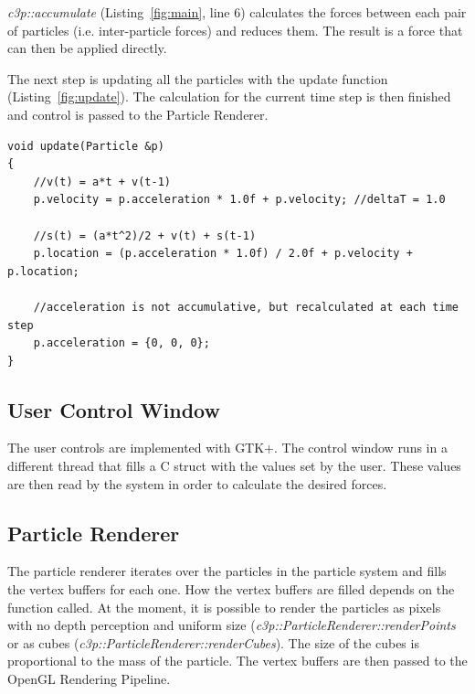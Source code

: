 \documentclass[runningheads,a4paper]{llncs}
\begin{document}
\emph{c3p::accumulate} (Listing~\ref{fig:main}, line 6) calculates the forces between each pair of particles (i.e. inter-particle forces) and reduces them. The result is a force that can then be applied directly.

The next step is updating all the particles with the update function (Listing~\ref{fig:update}). The calculation for the current time step is then finished and control is passed to the Particle Renderer.

\begin{lstlisting}[caption=update function]
void update(Particle &p)
{
	//v(t) = a*t + v(t-1)                                                            
	p.velocity = p.acceleration * 1.0f + p.velocity; //deltaT = 1.0                                  
                                                                                           
	//s(t) = (a*t^2)/2 + v(t) + s(t-1)                                               
	p.location = (p.acceleration * 1.0f) / 2.0f + p.velocity + p.location;
                                       	
	//acceleration is not accumulative, but recalculated at each time step          
	p.acceleration = {0, 0, 0};
}                                                            
\end{lstlisting}
\label{fig:update}

\subsection{User Control Window}
The user controls are implemented with GTK+\cite{gtk}. The control window runs in a different thread that fills a C struct with the values set by the user. These values are then read by the system in order to calculate the desired forces.

\subsection{Particle Renderer}
The particle renderer iterates over the particles in the particle system and fills the vertex buffers for each one. How the vertex buffers are filled depends on the function called. At the moment, it is possible to render the particles as pixels with no depth perception and uniform size (\emph{c3p::ParticleRenderer::renderPoints}
or as cubes (\emph{c3p::ParticleRenderer::renderCubes}). The size of the cubes is proportional to the mass of the particle. The vertex buffers are then passed to the OpenGL Rendering Pipeline.
\end{document}
